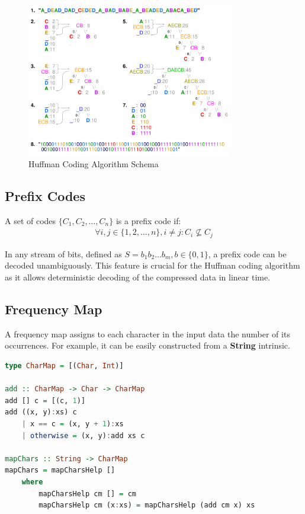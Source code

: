 \documentclass{article}
\begin{document}
\begin{figure}[H]
    \centering
    \includegraphics[width=0.8\textwidth]{schema.png}
    \caption{Huffman Coding Algorithm Schema}
    \label{fig:huffman-schema}
\end{figure}

\subsection{Prefix Codes}

A set of codes $\{C_1, C_2, \ldots, C_n\}$ is a prefix code if:
\begin{align}
    \forall i, j \in \{1, 2, \ldots, n\}, i \neq j: C_i \not\subseteq C_j
\end{align}

\noindent
In any stream of bits, defined as $S = b_1 b_2 \ldots b_m, b\in\{0,1\}$, 
a prefix code can be decoded unambiguously. This feature is crucial for
the Huffman coding algorithm as it allows deterministic decoding
of the compressed data in linear time.

\subsection{Frequency Map}

A frequency map assigns to each character in the input data the number of its occurrences.
For example, it can be easily constructed from a \textbf{String} intrinsic.

\begin{lstlisting}[language=Haskell, caption={Constructing a frequency map from a string.}]
type CharMap = [(Char, Int)]

add :: CharMap -> Char -> CharMap
add [] c = [(c, 1)]
add ((x, y):xs) c
    | x == c = (x, y + 1):xs
    | otherwise = (x, y):add xs c

mapChars :: String -> CharMap
mapChars = mapCharsHelp []
    where
        mapCharsHelp cm [] = cm
        mapCharsHelp cm (x:xs) = mapCharsHelp (add cm x) xs
\end{lstlisting}
\end{document}
